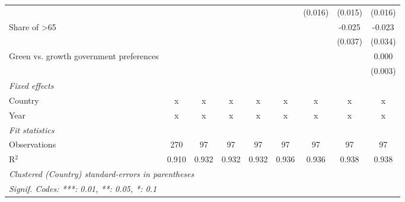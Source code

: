 \begin{table}[htbp]
\begin{tabular}{lcccccccc}
                                                            &         &         &         &         &         & (0.016) & (0.015) & (0.016)\\   
      Share of >65                                          &         &         &         &         &         &         & -0.025  & -0.023\\   
                                                            &         &         &         &         &         &         & (0.037) & (0.034)\\   
      Green vs. growth government preferences               &         &         &         &         &         &         &         & 0.000\\   
                                                            &         &         &         &         &         &         &         & (0.003)\\   
      \emph{Fixed effects}\\
      Country                                               & x       & x       & x       & x       & x       & x       & x       & x\\  
      Year                                                  & x       & x       & x       & x       & x       & x       & x       & x\\  
      \midrule \emph{Fit statistics}\\
      Observations                                          & 270     & 97      & 97      & 97      & 97      & 97      & 97      & 97\\  
      R$^2$                                                 & 0.910   & 0.932   & 0.932   & 0.932   & 0.936   & 0.936   & 0.938   & 0.938\\  
      \midrule
      \multicolumn{9}{l}{\emph{Clustered (Country) standard-errors in parentheses}}\\
      \multicolumn{9}{l}{\emph{Signif. Codes: ***: 0.01, **: 0.05, *: 0.1}}\\
   \end{tabular}
\end{table}


